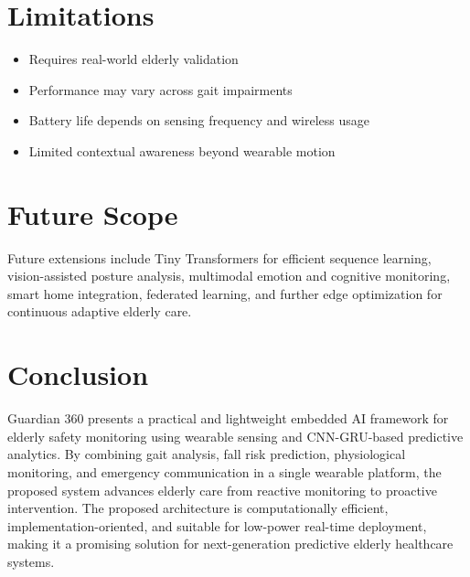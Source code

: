 \documentclass[conference]{IEEEtran}
\begin{document}
\section{Limitations}
\begin{itemize}[leftmargin=*]
\item Requires real-world elderly validation
\item Performance may vary across gait impairments
\item Battery life depends on sensing frequency and wireless usage
\item Limited contextual awareness beyond wearable motion
\end{itemize}

\section{Future Scope}
Future extensions include Tiny Transformers for efficient sequence learning, vision-assisted posture analysis, multimodal emotion and cognitive monitoring, smart home integration, federated learning, and further edge optimization for continuous adaptive elderly care.

\section{Conclusion}
Guardian 360 presents a practical and lightweight embedded AI framework for elderly safety monitoring using wearable sensing and CNN-GRU-based predictive analytics. By combining gait analysis, fall risk prediction, physiological monitoring, and emergency communication in a single wearable platform, the proposed system advances elderly care from reactive monitoring to proactive intervention. The proposed architecture is computationally efficient, implementation-oriented, and suitable for low-power real-time deployment, making it a promising solution for next-generation predictive elderly healthcare systems.
\end{document}
